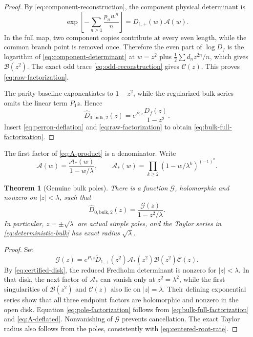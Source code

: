\documentclass[11pt]{article}
\newtheorem{theorem}{Theorem}[section]
\theoremstyle{definition}
\theoremstyle{remark}
\newcommand{\cA}{\mathcal A}
\newcommand{\cB}{\mathcal B}
\newcommand{\cC}{\mathcal C}
\newcommand{\cG}{\mathcal G}
\begin{document}
\begin{proof}
By \eqref{eq:component-reconstruction}, the component physical determinant is
\begin{equation}\label{eq:component-determinant}
 \exp\left[-\sum_{n\ge1}\frac{p_nw^n}{n}\right]
 =D_{1,+}(w)\cA(w).
\end{equation}
In the full map, two component copies contribute at every even length, while
the common branch point is removed once.  Therefore the even part of
$\log D_f$ is the logarithm of \eqref{eq:component-determinant} at $w=z^2$
plus $\tfrac12\sum d_nz^{2n}/n$, which gives $\cB(z^2)$.  The exact odd
trace \eqref{eq:odd-reconstruction} gives $\cC(z)$.  This proves
\eqref{eq:raw-factorization}.

The parity baseline exponentiates to $1-z^2$, while the regularized bulk
series omits the linear term $P_1z$.  Hence
\begin{equation}\label{eq:bulk-vs-raw}
 \widehat D_{0,\mathrm{bulk},2}(z)
 =e^{P_1z}\frac{D_f(z)}{1-z^2}.
\end{equation}
Insert \eqref{eq:perron-deflation} and
\eqref{eq:raw-factorization} to obtain
\eqref{eq:bulk-full-factorization}.
\end{proof}

The first factor of \eqref{eq:A-product} is a denominator.  Write
\begin{equation}\label{eq:A-deflated}
 \cA(w)=\frac{\cA_*(w)}{1-w/\lambda},
 \qquad
 \cA_*(w)=\prod_{k\ge2}(1-w/\lambda^k)^{(-1)^k}.
\end{equation}

\begin{theorem}[Genuine bulk poles]
\label{thm:bulk-poles}
There is a function $\cG$, holomorphic and nonzero on $|z|<\lambda$, such
that
\begin{equation}\label{eq:pole-factorization}
 \boxed{
 \widehat D_{0,\mathrm{bulk},2}(z)
 =\frac{\cG(z)}{1-z^2/\lambda}.}
\end{equation}
In particular, $z=\pm\sqrt\lambda$ are actual simple poles, and the Taylor
series in \eqref{eq:deterministic-bulk} has exact radius
$\sqrt\lambda$.
\end{theorem}

\begin{proof}
Set
\begin{equation}\label{eq:G-definition}
 \cG(z)=e^{P_1z}\widetilde D_{1,+}(z^2)
 \cA_*(z^2)\cB(z^2)\cC(z).
\end{equation}
By \eqref{eq:certified-disk}, the reduced Fredholm determinant is nonzero for
$|z|<\lambda$.  In that disk, the next factor of $\cA_*$ can vanish only at
$z^2=\lambda^2$, while the first singularities of $\cB(z^2)$ and $\cC(z)$
also lie on $|z|=\lambda$.  Their defining exponential series show that all
three endpoint factors are holomorphic and nonzero in the open disk.
Equation \eqref{eq:pole-factorization} follows from
\eqref{eq:bulk-full-factorization} and \eqref{eq:A-deflated}.  Nonvanishing of
$\cG$ prevents cancellation.  The exact Taylor radius also follows from the
poles, consistently with \eqref{eq:centered-root-rate}.
\end{proof}
\end{document}
